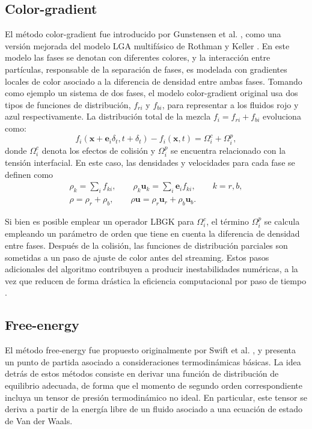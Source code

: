 \subsection*{Color-gradient}
El m\'etodo color-gradient fue introducido por Gunstensen et al. \cite{gunstensen_lattice_1991}, como una versi\'on mejorada del modelo LGA multif\'asico de Rothman y Keller \cite{rothman_immiscible_1988}. En este modelo las fases se denotan con diferentes colores, y la interacci\'on entre part\'iculas, responsable de la separaci\'on de fases, es modelada con gradientes locales de color asociado a la diferencia de densidad entre ambas fases. Tomando como ejemplo un sistema de dos fases, el modelo color-gradient original usa dos tipos de funciones de distribuci\'on, $f_{ri}$ y $f_{bi}$, para representar a los fluidos rojo y azul respectivamente. La distribuci\'on total de la mezcla $f_i = f_{ri}+f_{bi}$ evoluciona como:
\begin{equation}
	f_i(\bm{x}+\bm{e}_i\delta_t,t+\delta_t) - f_i(\bm{x},t) = \Omega_i^c + \Omega_i^p,
\end{equation}
donde $\Omega_i^c$ denota los efectos de colisi\'on y $\Omega_i^p$ se encuentra relacionado con la tensi\'on interfacial. En este caso, las densidades y velocidades para cada fase se definen como
\begin{equation}
	\begin{gathered}
	\rho_k = \sum_i f_{ki}, \qquad \rho_k\bm{u}_k = \sum_i \bm{e}_if_{ki}, \qquad k=r,b, \\
	\rho = \rho_r + \rho_b, \qquad \rho\bm{u} = \rho_r\bm{u}_r + \rho_b\bm{u}_b.
	\end{gathered}
\end{equation}

Si bien es posible emplear un operador LBGK para $\Omega_i^c$, el t\'ermino $\Omega_i^p$ se calcula empleando un par\'ametro de orden que tiene en cuenta la diferencia de densidad entre fases. Despu\'es de la colisi\'on, las funciones de distribuci\'on parciales son sometidas a un paso de ajuste de color antes del streaming. Estos pasos adicionales del algoritmo contribuyen a producir inestabilidades num\'ericas, a la vez que reducen de forma dr\'astica la eficiencia computacional por paso de tiempo \cite{guo_lattice_2013}.

\subsection*{Free-energy}
El m\'etodo free-energy fue propuesto originalmente por Swift et al. \cite{swift_lattice_1996}, y presenta un punto de partida asociado a consideraciones termodin\'amicas b\'asicas. La idea detr\'as de estos m\'etodos consiste en derivar una funci\'on de distribuci\'on de equilibrio adecuada, de forma que el momento de segundo orden correspondiente incluya un tensor de presi\'on termodin\'amico no ideal. En particular, este tensor se deriva a partir de la energ\'ia libre de un fluido asociado a una ecuaci\'on de estado de Van der Waals.